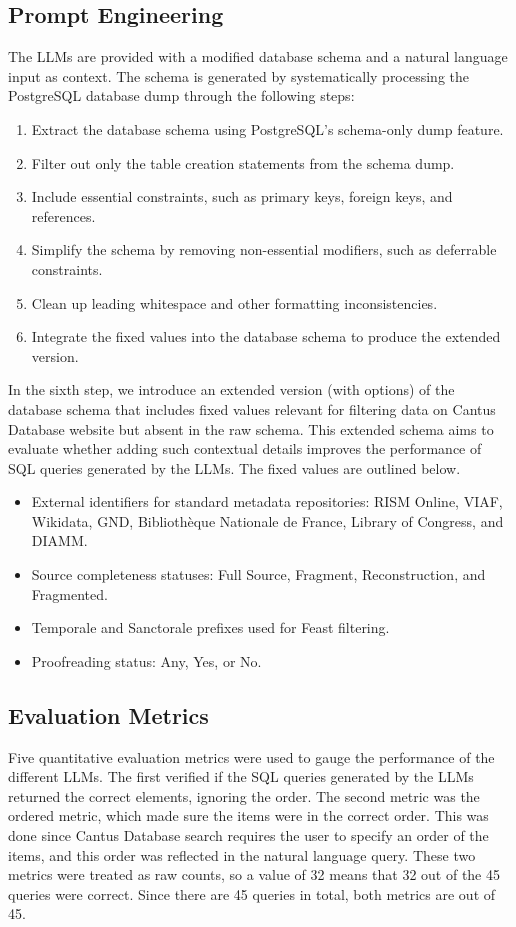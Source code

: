 \subsection{Prompt Engineering}
\label{sec:prompt_engineering}
The LLMs are provided with a modified database schema and a natural language input as context. The schema is generated by systematically processing the PostgreSQL database dump through the following steps:

\begin{enumerate}
    \item Extract the database schema using PostgreSQL's schema-only dump feature.
    \item Filter out only the table creation statements from the schema dump.
    \item Include essential constraints, such as primary keys, foreign keys, and references.
    \item Simplify the schema by removing non-essential modifiers, such as deferrable constraints.
    \item Clean up leading whitespace and other formatting inconsistencies.
    \item Integrate the fixed values into the database schema to produce the extended version.
\end{enumerate}

In the sixth step, we introduce an extended version (with options) of the database schema that includes fixed values relevant for filtering data on Cantus Database website but absent in the raw schema. This extended schema aims to evaluate whether adding such contextual details improves the performance of SQL queries generated by the LLMs. The fixed values are outlined below.
\begin{itemize}
    \item External identifiers for standard metadata repositories: RISM Online, VIAF, Wikidata, GND, Biblioth\`{e}que Nationale de France, Library of Congress, and DIAMM.
    \item Source completeness statuses: Full Source, Fragment, Reconstruction, and Fragmented.
    \item Temporale and Sanctorale prefixes used for Feast filtering.
    \item Proofreading status: Any, Yes, or No.
\end{itemize}

\subsection{Evaluation Metrics}
\label{sec:evaluation_metrics}
Five quantitative evaluation metrics were used to gauge the performance of the different LLMs. The first verified if the SQL queries generated by the LLMs returned the correct elements, ignoring the order. The second metric was the ordered metric, which made sure the items were in the correct order. This was done since Cantus Database search requires the user to specify an order of the items, and this order was reflected in the natural language query. These two metrics were treated as raw counts, so a value of 32 means that 32 out of the 45 queries were correct. Since there are 45 queries in total, both metrics are out of 45.

